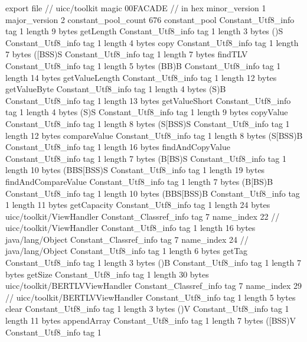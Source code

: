 export file {		// uicc/toolkit
	magic	00FACADE		 // in hex
	minor_version	1
	major_version	2
	constant_pool_count	676
	constant_pool {
		Constant_Utf8_info {
			tag	1
			length	9
			bytes	getLength
		}
		Constant_Utf8_info {
			tag	1
			length	3
			bytes	()S
		}
		Constant_Utf8_info {
			tag	1
			length	4
			bytes	copy
		}
		Constant_Utf8_info {
			tag	1
			length	7
			bytes	([BSS)S
		}
		Constant_Utf8_info {
			tag	1
			length	7
			bytes	findTLV
		}
		Constant_Utf8_info {
			tag	1
			length	5
			bytes	(BB)B
		}
		Constant_Utf8_info {
			tag	1
			length	14
			bytes	getValueLength
		}
		Constant_Utf8_info {
			tag	1
			length	12
			bytes	getValueByte
		}
		Constant_Utf8_info {
			tag	1
			length	4
			bytes	(S)B
		}
		Constant_Utf8_info {
			tag	1
			length	13
			bytes	getValueShort
		}
		Constant_Utf8_info {
			tag	1
			length	4
			bytes	(S)S
		}
		Constant_Utf8_info {
			tag	1
			length	9
			bytes	copyValue
		}
		Constant_Utf8_info {
			tag	1
			length	8
			bytes	(S[BSS)S
		}
		Constant_Utf8_info {
			tag	1
			length	12
			bytes	compareValue
		}
		Constant_Utf8_info {
			tag	1
			length	8
			bytes	(S[BSS)B
		}
		Constant_Utf8_info {
			tag	1
			length	16
			bytes	findAndCopyValue
		}
		Constant_Utf8_info {
			tag	1
			length	7
			bytes	(B[BS)S
		}
		Constant_Utf8_info {
			tag	1
			length	10
			bytes	(BBS[BSS)S
		}
		Constant_Utf8_info {
			tag	1
			length	19
			bytes	findAndCompareValue
		}
		Constant_Utf8_info {
			tag	1
			length	7
			bytes	(B[BS)B
		}
		Constant_Utf8_info {
			tag	1
			length	10
			bytes	(BBS[BSS)B
		}
		Constant_Utf8_info {
			tag	1
			length	11
			bytes	getCapacity
		}
		Constant_Utf8_info {
			tag	1
			length	24
			bytes	uicc/toolkit/ViewHandler
		}
		Constant_Classref_info {
			tag	7
			name_index	22		// uicc/toolkit/ViewHandler
		}
		Constant_Utf8_info {
			tag	1
			length	16
			bytes	java/lang/Object
		}
		Constant_Classref_info {
			tag	7
			name_index	24		// java/lang/Object
		}
		Constant_Utf8_info {
			tag	1
			length	6
			bytes	getTag
		}
		Constant_Utf8_info {
			tag	1
			length	3
			bytes	()B
		}
		Constant_Utf8_info {
			tag	1
			length	7
			bytes	getSize
		}
		Constant_Utf8_info {
			tag	1
			length	30
			bytes	uicc/toolkit/BERTLVViewHandler
		}
		Constant_Classref_info {
			tag	7
			name_index	29		// uicc/toolkit/BERTLVViewHandler
		}
		Constant_Utf8_info {
			tag	1
			length	5
			bytes	clear
		}
		Constant_Utf8_info {
			tag	1
			length	3
			bytes	()V
		}
		Constant_Utf8_info {
			tag	1
			length	11
			bytes	appendArray
		}
		Constant_Utf8_info {
			tag	1
			length	7
			bytes	([BSS)V
		}
		Constant_Utf8_info {
			tag	1
}}}
